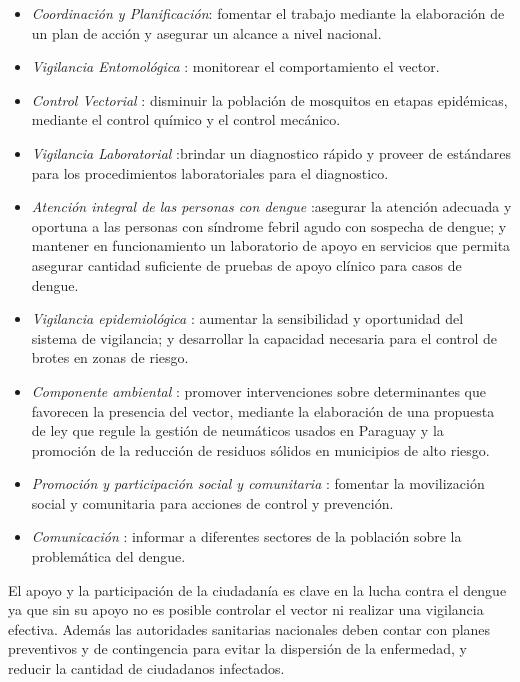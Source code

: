 \begin{itemize}
    \item \textit{Coordinación y Planificación}: fomentar el trabajo mediante la elaboración de un plan de acción y asegurar un alcance a nivel nacional.

    \item \textit{Vigilancia Entomológica} : monitorear el comportamiento el vector.

    \item \textit{Control Vectorial} : disminuir la población de mosquitos en etapas epidémicas, mediante el control químico y el control mecánico.

    \item \textit{Vigilancia Laboratorial} :brindar un diagnostico rápido y proveer de estándares para los procedimientos laboratoriales para el diagnostico.

    \item \textit{Atención integral de las personas con dengue} :asegurar la atención adecuada y oportuna a las personas con síndrome febril agudo con sospecha de dengue; y  mantener en funcionamiento un laboratorio de apoyo en servicios que permita asegurar cantidad suficiente de pruebas de apoyo clínico para casos de dengue.

    \item \textit{Vigilancia epidemiológica} : aumentar la sensibilidad y oportunidad del sistema de vigilancia; y desarrollar la capacidad necesaria para el control de brotes en zonas de riesgo.

    \item \textit{Componente ambiental} : promover intervenciones sobre determinantes que favorecen la presencia del vector, mediante la elaboración de una propuesta de ley que regule la gestión de neumáticos usados en Paraguay y la promoción de la reducción de residuos sólidos en municipios de alto riesgo.

    \item \textit{Promoción y participación social y comunitaria} : fomentar la movilización social y comunitaria para acciones de control y prevención.

    \item \textit{Comunicación} : informar a diferentes sectores de la población sobre la problemática del dengue.
\end{itemize}

El apoyo y la participación de la ciudadanía es clave en la lucha contra el dengue ya que sin su
apoyo no es posible controlar el vector ni realizar una vigilancia efectiva. Además las
autoridades sanitarias nacionales deben contar con planes preventivos y de contingencia para
evitar la dispersión de la enfermedad, y reducir la cantidad de ciudadanos infectados.
